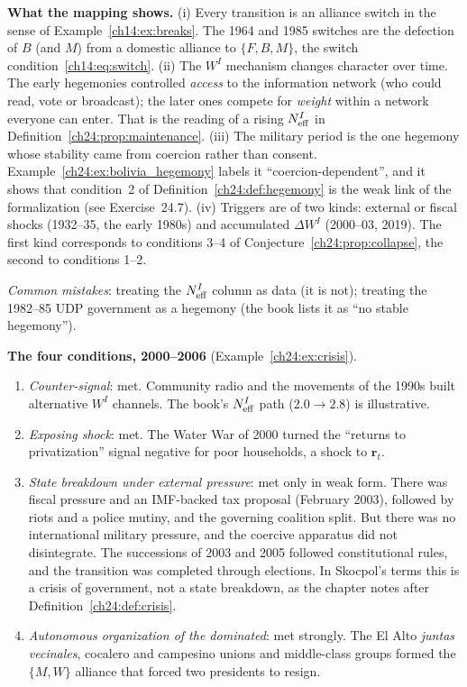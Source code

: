 \documentclass[../solutions_manual.tex]{subfiles}
\begin{document}
 \textbf{What the mapping shows.} (i) Every transition is an alliance switch in the sense of Example~\ref{ch14:ex:breaks}. The 1964 and 1985 switches are the defection of $B$ (and $M$) from a domestic alliance to $\{F,B,M\}$, the switch condition~\eqref{ch14:eq:switch}. (ii) The $W^I$ mechanism changes character over time. The early hegemonies controlled \emph{access} to the information network (who could read, vote or broadcast); the later ones compete for \emph{weight} within a network everyone can enter. That is the reading of a rising $N_{\text{eff}}^I$ in Definition~\ref{ch24:prop:maintenance}. (iii) The military period is the one hegemony whose stability came from coercion rather than consent. Example~\ref{ch24:ex:bolivia_hegemony} labels it ``coercion-dependent'', and it shows that condition~2 of Definition~\ref{ch24:def:hegemony} is the weak link of the formalization (see Exercise~24.7). (iv) Triggers are of two kinds: external or fiscal shocks (1932--35, the early 1980s) and accumulated $\Delta W^I$ (2000--03, 2019). The first kind corresponds to conditions 3--4 of Conjecture~\ref{ch24:prop:collapse}, the second to conditions 1--2.

\emph{Common mistakes}: treating the $N_{\text{eff}}^I$ column as data (it is not); treating the 1982--85 UDP government as a hegemony (the book lists it as ``no stable hegemony'').


 \textbf{The four conditions, 2000--2006} (Example~\ref{ch24:ex:crisis}).
\begin{enumerate}
\item \emph{Counter-signal}: met. Community radio and the movements of the 1990s built alternative $W^I$ channels. The book's $N_{\text{eff}}^I$ path ($2.0 \to 2.8$) is illustrative.
\item \emph{Exposing shock}: met. The Water War of 2000 turned the ``returns to privatization'' signal negative for poor households, a shock to $\mathbf{r}_t$.
\item \emph{State breakdown under external pressure}: met only in weak form. There was fiscal pressure and an IMF-backed tax proposal (February 2003), followed by riots and a police mutiny, and the governing coalition split. But there was no international military pressure, and the coercive apparatus did not disintegrate. The successions of 2003 and 2005 followed constitutional rules, and the transition was completed through elections. In Skocpol's terms this is a crisis of government, not a state breakdown, as the chapter notes after Definition~\ref{ch24:def:crisis}.
\item \emph{Autonomous organization of the dominated}: met strongly. The El Alto \textit{juntas vecinales}, cocalero and campesino unions and middle-class groups formed the $\{M,W\}$ alliance that forced two presidents to resign.
\end{enumerate}
\end{document}
